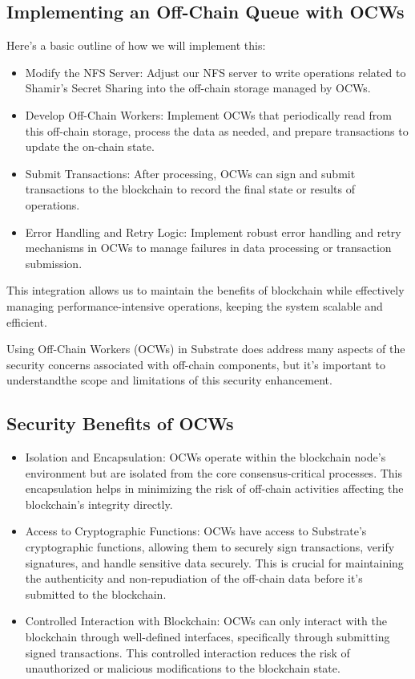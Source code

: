 \documentclass{tufte-handout}
\begin{document}
\subsection{Implementing an Off-Chain Queue with OCWs}\label{sec:headings}
Here's a basic outline of how we will implement this:
\begin{itemize}
\item Modify the NFS Server: Adjust our NFS server to write operations related to Shamir's Secret Sharing into the off-chain storage managed by OCWs.
\item Develop Off-Chain Workers: Implement OCWs that periodically read from this off-chain storage, process the data as needed, and prepare transactions to update
the on-chain state.
\item Submit Transactions: After processing, OCWs can sign and submit transactions to the blockchain to record the final state or results of operations.
\item Error Handling and Retry Logic: Implement robust error handling and retry mechanisms in OCWs to manage failures in data processing or transaction submission.
\end{itemize}

This integration allows us to maintain the benefits of blockchain while effectively managing performance-intensive operations, keeping the system scalable and efficient.

Using Off-Chain Workers (OCWs) in Substrate does address many aspects of the security concerns associated with off-chain components, but it's important to understandthe scope and limitations of this security enhancement.

\subsection{Security Benefits of OCWs}\label{sec:headings}
\begin{itemize}
\item Isolation and Encapsulation: OCWs operate within the blockchain node's environment but are isolated from the core consensus-critical processes. This encapsulation
helps in minimizing the risk of off-chain activities affecting the blockchain's integrity directly.
\item Access to Cryptographic Functions: OCWs have access to Substrate's cryptographic functions, allowing them to securely sign transactions, verify signatures, and
handle sensitive data securely. This is crucial for maintaining the authenticity and non-repudiation of the off-chain data before it's submitted to the blockchain.
\item Controlled Interaction with Blockchain: OCWs can only interact with the blockchain through well-defined interfaces, specifically through submitting signed
transactions. This controlled interaction reduces the risk of unauthorized or malicious modifications to the blockchain state.
\end{itemize}
\end{document}
